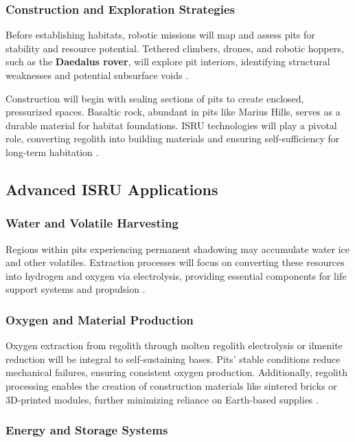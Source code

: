 \subsubsection{Construction and Exploration Strategies}

Before establishing habitats, robotic missions will map and assess pits for stability and resource potential. Tethered climbers, drones, and robotic hoppers, such as the \textbf{Daedalus rover}, will explore pit interiors, identifying structural weaknesses and potential subsurface voids \cite{Carrer2024}. 

Construction will begin with sealing sections of pits to create enclosed, pressurized spaces. Basaltic rock, abundant in pits like Marius Hills, serves as a durable material for habitat foundations. ISRU technologies will play a pivotal role, converting regolith into building materials and ensuring self-sufficiency for long-term habitation \cite{jsanders-isru, new-wagner}.

\subsection{Advanced ISRU Applications}

\subsubsection{Water and Volatile Harvesting}

Regions within pits experiencing permanent shadowing may accumulate water ice and other volatiles. Extraction processes will focus on converting these resources into hydrogen and oxygen via electrolysis, providing essential components for life support systems and propulsion \cite{jsanders-isru}.

\subsubsection{Oxygen and Material Production}

Oxygen extraction from regolith through molten regolith electrolysis or ilmenite reduction will be integral to self-sustaining bases. Pits’ stable conditions reduce mechanical failures, ensuring consistent oxygen production. Additionally, regolith processing enables the creation of construction materials like sintered bricks or 3D-printed modules, further minimizing reliance on Earth-based supplies \cite{bases-feng}.

\subsubsection{Energy and Storage Systems}

